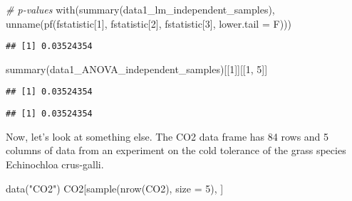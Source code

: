 \documentclass[
]{book}
\newenvironment{Shaded}{\begin{snugshade}}{\end{snugshade}}
\newcommand{\AttributeTok}[1]{\textcolor[rgb]{0.77,0.63,0.00}{#1}}
\newcommand{\CommentTok}[1]{\textcolor[rgb]{0.56,0.35,0.01}{\textit{#1}}}
\newcommand{\DecValTok}[1]{\textcolor[rgb]{0.00,0.00,0.81}{#1}}
\newcommand{\FunctionTok}[1]{\textcolor[rgb]{0.00,0.00,0.00}{#1}}
\newcommand{\NormalTok}[1]{#1}
\newcommand{\SpecialCharTok}[1]{\textcolor[rgb]{0.00,0.00,0.00}{#1}}
\newcommand{\StringTok}[1]{\textcolor[rgb]{0.31,0.60,0.02}{#1}}
\begin{document}
\begin{Shaded}
\begin{Highlighting}[]
\CommentTok{\# p{-}values}
\FunctionTok{with}\NormalTok{(}\FunctionTok{summary}\NormalTok{(data1\_lm\_independent\_samples), }\FunctionTok{unname}\NormalTok{(}\FunctionTok{pf}\NormalTok{(fstatistic[}\DecValTok{1}\NormalTok{],}
\NormalTok{    fstatistic[}\DecValTok{2}\NormalTok{], fstatistic[}\DecValTok{3}\NormalTok{], }\AttributeTok{lower.tail =}\NormalTok{ F)))}
\end{Highlighting}
\end{Shaded}

\begin{verbatim}
## [1] 0.03524354
\end{verbatim}

\begin{Shaded}
\begin{Highlighting}[]
\FunctionTok{summary}\NormalTok{(data1\_ANOVA\_independent\_samples)[[}\DecValTok{1}\NormalTok{]][[}\DecValTok{1}\NormalTok{, }\DecValTok{5}\NormalTok{]]}
\end{Highlighting}
\end{Shaded}

\begin{verbatim}
## [1] 0.03524354
\end{verbatim}

\begin{Shaded}
\end{Shaded}

\begin{verbatim}
## [1] 0.03524354
\end{verbatim}

Now, let's look at something else. The CO2 data frame has 84 rows and 5
columns of data from an experiment on the cold tolerance of the grass
species Echinochloa crus-galli.

\begin{Shaded}
\begin{Highlighting}[]
\FunctionTok{data}\NormalTok{(}\StringTok{"CO2"}\NormalTok{)}
\NormalTok{CO2[}\FunctionTok{sample}\NormalTok{(}\FunctionTok{nrow}\NormalTok{(CO2), }\AttributeTok{size =} \DecValTok{5}\NormalTok{), ]}
\end{Highlighting}
\end{Shaded}
\end{document}
